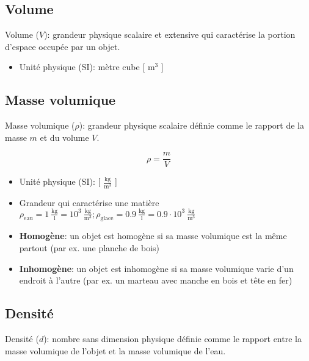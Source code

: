 \documentclass[
    11pt,
    a4paper,
    oneside,
    headinlcude, footinclude,
    twoside,
]{report}
\begin{document}
\subsection{Volume}
\label{sub:volume}

Volume ($V$): grandeur physique scalaire et extensive qui caractérise la portion
d'espace occupée par un objet.

\begin{itemize}
\item Unité physique (SI): mètre cube [ m$^{3}$ ]
\end{itemize}


\subsection{Masse volumique}
\label{sub:masse_volumique}

Masse volumique ($\rho$): grandeur physique scalaire définie comme le rapport
de la masse $m$ et du volume $V$.

\begin{equation}
\rho = \frac{m}{V}
\end{equation}

\begin{itemize}
\item Unité physique (SI): [ $\frac{ \textrm{kg} }{ \textrm{m}^{3} }$ ]

\item Grandeur qui caractérise une matière
$\rho_{ \textrm{eau} } =  1 \ \frac{\textrm{kg} }{ \textrm{l}} =
10 ^{3} \ \frac{\textrm{kg}}{\textrm{m} ^{3}}; \rho_{ \textrm{glace} } =
0.9 \ \frac{\textrm{kg} }{ \textrm{l}} =
0.9 \cdot 10 ^{3} \ \frac{\textrm{kg}}{\textrm{m} ^{3}}$

\item \textbf{Homogène}: un objet est homogène si sa masse volumique est la
même partout (par ex. une planche de bois)

\item \textbf{Inhomogène}: un objet est inhomogène si sa masse volumique
varie d'un endroit à l'autre (par ex. un marteau avec manche en bois
et tête en fer)
\end{itemize}

\subsection{Densité}
\label{sub:densite}

Densité ($d$): nombre sans dimension physique définie comme le rapport entre
la masse volumique de l'objet et la masse volumique de l'eau.
\end{document}
